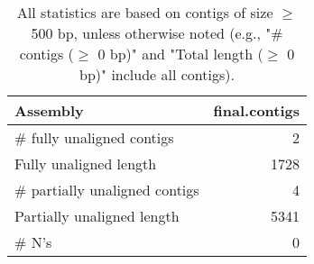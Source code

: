 \documentclass[12pt,a4paper]{article}
\begin{document}
\begin{table}[ht]
\begin{center}
\caption{All statistics are based on contigs of size $\geq$ 500 bp, unless otherwise noted (e.g., "\# contigs ($\geq$ 0 bp)" and "Total length ($\geq$ 0 bp)" include all contigs).}
\begin{tabular}{|l*{1}{|r}|}
\hline
Assembly & final.contigs \\ \hline
\# fully unaligned contigs & 2 \\ \hline
Fully unaligned length & 1728 \\ \hline
\# partially unaligned contigs & 4 \\ \hline
Partially unaligned length & 5341 \\ \hline
\# N's & 0 \\ \hline
\end{tabular}
\end{center}
\end{table}
\end{document}
